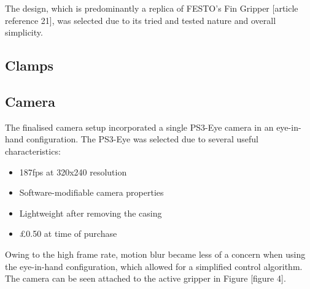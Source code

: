 \documentclass[conference]{IEEEtran}
\begin{document}
The design, which is predominantly a replica of FESTO’s Fin Gripper [article reference 21], was selected due to its tried and tested nature and overall simplicity. 


\subsection{Clamps}

\subsection{Camera}
The finalised camera setup incorporated a single PS3-Eye camera in an eye-in-hand configuration. The PS3-Eye was selected due to several useful characteristics:
\begin{itemize}
	\item 187fps at 320x240 resolution
	
	\item Software-modifiable camera properties
	
	\item Lightweight after removing the casing
	
	\item \pounds0.50 at time of purchase
\end{itemize}

Owing to the high frame rate, motion blur became less of a concern when using the eye-in-hand configuration, which allowed for a simplified control algorithm. The camera can be seen attached to the active gripper in Figure [figure 4].
\end{document}
